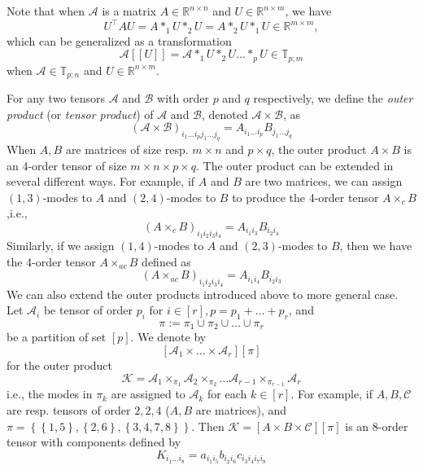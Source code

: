 \documentclass[11pt, oneside]{article}  %
\newcommand{\dsb}[1]{[\![#1]\!]}
\newcommand{\set}[1]{\left\{#1\right\}}
\newcommand{\RR}{\mathbb{R}}
\newcommand{\TT}{\mathbb{T}}
\newcommand{\A}{\mathcal{A}}
\newcommand{\B}{\mathcal{B}}
\newcommand{\C}{\mathcal{C}}
\newcommand{\caK}{\mathcal{K}}
\newcommand{\beq}{\begin{equation}}
\newcommand{\eeq}{\end{equation}}
\begin{document}
Note that when $\A$ is a matrix $A\in\RR^{n\times n}$ and $U\in\RR^{n\times m}$, we have 
\[
U^{\top} A U = A\ast_{1} U\ast_{2} U = A\ast_{2} U\ast_{1} U \in\RR^{m\times m},
\]
which can be generalized as a transformation 
\[
\A\dsb{U} = \A\ast_{1} U \ast_{2} U \ldots \ast_{p} U \in\TT_{p;m}
\]
when $\A\in\TT_{p;n}$ and $U\in\RR^{n\times m}$. 

For any two tensors $\A$ and $\B$ with order $p$ and $q$ respectively, we define the \emph{outer product} (or \emph{tensor product}) of 
$\A$ and $\B$, denoted $\A\times \B$, as 
\beq\label{eq:outprod}
(\A\times\B)_{i_{1}\ldots i_{p}j_{1}\ldots j_{q}} = A_{i_{1}\ldots i_{p}}B_{j_{1}\ldots j_{q}}
\eeq
When $A, B$ are matrices of size resp. $m\times n$ and $p\times q$, the outer product $A\times B$ is an 4-order tensor 
of size $m\times n\times p\times q$.  The outer product can be extended in several different ways. For example, if $A$ and $B$ are two matrices, 
we can assign $(1,3)$-modes to $A$ and $(2,4)$-modes to $B$ to produce the 4-order tensor $A\times_{c} B$,i.e.,  
\beq\label{eq:crossprod}
(A\times_{c} B)_{i_{1}i_{2}i_{3}i_{4}} = A_{i_{1}i_{3}}B_{i_{2}i_{4}}
\eeq 
Similarly, if we assign $(1,4)$-modes to $A$ and $(2,3)$-modes to $B$, then we have the 4-order tensor $A\times_{ac} B$ defined as 
\beq\label{eq:acrossprod}
(A\times_{ac} B)_{i_{1}i_{2}i_{3}i_{4}} = A_{i_{1}i_{4}}B_{i_{2}i_{3}}
\eeq
We can also extend the outer products introduced above to more general case. Let $\A_{i}$ be tensor of order $p_{i}$ for $i\in [r], p=p_{1}+\ldots +p_{r}$, and 
\[ \pi:=\pi_{1}\cup\pi_{2}\cup \ldots \cup \pi_{r}     \]
be a partition of set $[p]$.  We denote by
\beq\label{eq:prod-partit01} 
[\A_{1}\times\ldots\times\A_{r}][\pi] 
\eeq
for the outer product 
\beq\label{eq:prod-partit02} 
\caK = \A_{1}\times_{\pi_{1}}\A_{2}\times_{\pi_{2}}\ldots \A_{r-1}\times_{\pi_{r-1}}\A_{r} 
\eeq
i.e., the modes in $\pi_{k}$ are assigned to $\A_{k}$ for each $k\in [r]$. For example, if $A, B, \C$ are resp. tensors of order $2,2,4$ 
($A,B$ are matrices), and $\pi=\set{\set{1,5},\set{2,6},\set{3,4,7,8}}$.  Then $\caK=[A\times B\times \C][\pi]$ is an 8-order tensor with components 
defined by
\[ K_{i_{1}\ldots i_{8}} = a_{i_{1}i_{5}}b_{i_{2}i_{6}}c_{i_{3}i_{4}i_{7}i_{8}} \] 
\end{document}
